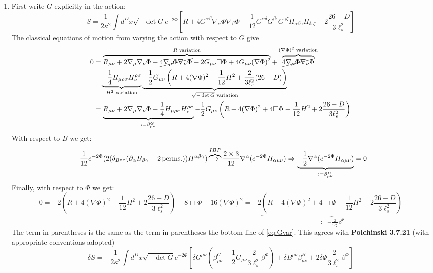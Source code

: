 \documentclass[11pt, class=article, crop=false]{standalone}
\begin{document}
\begin{enumerate}
	\item First write $G$ explicitly in the action:
	\[
		S = \frac{1}{2\kappa^2} \int d^D x \sqrt{- \det G } e^{-2 \Phi} \left[R + 4 G^{\alpha \beta} \nabla_\alpha \Phi \nabla_\beta \Phi - \frac{1}{12} G^{\alpha \delta} G^{\beta \epsilon} G^{\gamma \zeta} H_{\alpha \beta \gamma} H_{\delta \epsilon \zeta} + 2 \frac{26 - D}{3 \ell_s^2} \right]
	\]
	 The classical equations of motion from varying the action with respect to $G$ give
	\begin{equation}\label{eq:Gvar}
	\begin{aligned}
			0 &= \overbrace{R_{\mu \nu} + 2 \nabla_\mu \nabla_\nu \Phi - \cancel{4 \nabla_\mu \Phi \nabla_\nu \Phi}  - 2 G_{\mu \nu} \Box \Phi + 4 G_{\mu \nu} (\nabla \Phi)^2}^{R \text{ variation}} + \overbrace{\cancel{4 \nabla_\mu \Phi \nabla_\nu \Phi}}^{(\nabla \Phi)^2 \text{ variation}}\\
			& \quad \underbrace{-\frac14 H_{\mu \rho \sigma} H_{\nu}^{\rho \sigma}}_{H^2 \text{ variation}}  \underbrace{- \frac12 G_{\mu \nu} \left( R + 4 (\nabla \Phi)^2 - \frac{1}{12} H^2 + \frac{2}{3 \ell_s^2} (26-D)  \right)}_{\sqrt{-\det G} \text{ variation}}\\
			& = \underbrace{R_{\mu \nu} + 2 \nabla_\mu \nabla_\nu \Phi - \frac14 H_{\mu \rho \sigma} H_{\nu}^{\rho \sigma}}_{:= \beta^G_{\mu \nu}} - \frac12 G_{\mu \nu} \left(R - 4 (\nabla \Phi)^2 + 4 \Box \Phi -\frac{1}{12} H^2 + 2 \frac{26 - D}{3 \ell_s^2} \right)
		\end{aligned}
	\end{equation}
	With respect to $B$ we get:
	\[
		-\frac{1}{12} e^{-2 \Phi} (2 (\delta_{B^{\mu \nu}} (\partial_\alpha B_{\beta \gamma} + 2 \,\mathrm{perms.})) H^{\alpha \beta \gamma} ) \overbrace{\to}^{IBP} \frac{2 \times 3}{12} \nabla^\alpha (e^{-2 \Phi} H_{\alpha \mu \nu}) \Rightarrow \underbrace{ - \frac12 \nabla^\alpha (e^{-2\Phi} H_{\alpha \mu \nu})}_{:= \beta^B_{\mu \nu}} = 0
	\]
	Finally, with respect to $\Phi$ we get:
	\[
		0 = -2 \left(R + 4(\nabla \Phi)^2 -\frac{1}{12} H^2 + 2 \frac{26 - D}{3 \ell_s^2}\right) - 8 \Box \Phi + 16 (\nabla \Phi)^2 = -2 \underbrace{\left( R - 4 (\nabla \Phi)^2 + 4 \Box \Phi - \frac{1}{12} H^2 + 2 \frac{26 - D}{3 \ell_s^2}\right)}_{:=-\frac{2}{3 \ell_s^2} \beta^\Phi}
	\]
	The term in parentheses is the same as the term in parentheses the bottom line of \eqref{eq:Gvar}. 
	This agrees with \textbf{Polchinski 3.7.21} (with appropriate conventions adopted)
	\[
		\delta S = - \frac{1}{2\kappa^2} \int d^D x \sqrt{- \det G} e^{-2 \Phi} \left[\delta G^{\mu \nu} \left(\beta^G_{\mu \nu} - \frac12 G_{\mu \nu} \frac{2}{3 \ell_s^2} \beta^\Phi \right) + \delta B^{\mu \nu} \beta^B_{\mu \nu} + 2 \delta \Phi \frac{2}{3 \ell_s^2} \beta^\Phi \right]
	\]
	

\end{enumerate}
\end{document}
